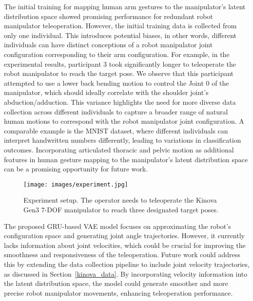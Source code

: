 The initial training for mapping human arm gestures to the manipulator’s latent distribution space showed promising performance for redundant robot manipulator teleoperation. However, the initial training data is collected from only one individual. This introduces potential biases, in other words, different individuals can have distinct conceptions of a robot manipulator joint configuration corresponding to their arm configuration. For example, in the experimental results, participant $3$ took significantly longer to teleoperate the robot manipulator to reach the target pose. We observe that this participant attempted to use a lower back bending motion to control the Joint $0$ of the manipulator, which should ideally correlate with the shoulder joint's abduction/adduction. This variance highlights the need for more diverse data collection across different individuals to capture a broader range of natural human motions to correspond with the robot manipulator joint configuration. A comparable example is the MNIST dataset, where different individuals can interpret handwritten numbers differently, leading to variations in classification outcomes. Incorporating articulated thoracic and pelvic motion as additional features in human gesture mapping to the manipulator’s latent distribution space can be a promising opportunity for future work.
\begin{figure}[t]
    \centering
    \texttt{[image: images/experiment.jpg]}
    \captionsetup{font=footnotesize}
    \caption{Experiment setup. The operator needs to teleoperate the Kinova Gen$3$ $7$-DOF manipulator to reach three designated target poses. }
    \label{fig:experiment}
    \vspace{-7mm}
\end{figure}
The proposed GRU-based VAE model focuses on approximating the robot's configuration space and generating joint angle trajectories. However, it currently lacks information about joint velocities, which could be crucial for improving the smoothness and responsiveness of the teleoperation. Future work could address this by extending the data collection pipeline to include joint velocity trajectories, as discussed in Section~\ref{kinova_data}. By incorporating velocity information into the latent distribution space, the model could generate smoother and more precise robot manipulator movements, enhancing teleoperation performance.
